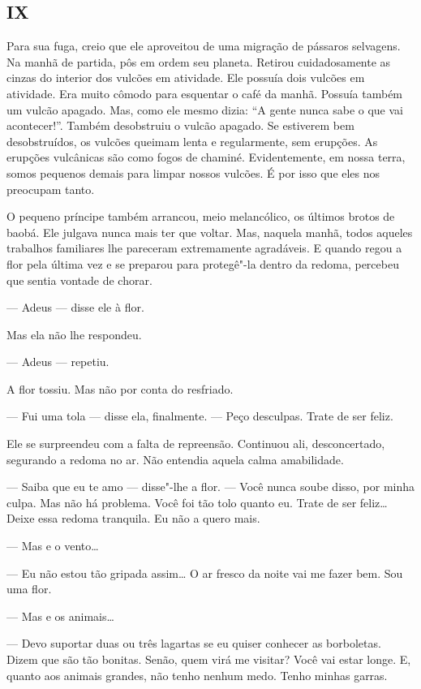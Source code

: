 \begin{Parallel}[p]{}{}
{\section{IX}

Para sua fuga, creio que ele aproveitou de uma migração de pássaros
selvagens. Na manhã de partida, pôs em ordem seu planeta. Retirou
cuidadosamente as cinzas do interior dos vulcões em atividade. Ele
possuía dois vulcões em atividade. Era muito cômodo para esquentar o
café da manhã. Possuía também um vulcão apagado. Mas, como ele mesmo
dizia: ``A gente nunca sabe o que vai acontecer!''. Também desobstruiu o
vulcão apagado. Se estiverem bem desobstruídos, os vulcões queimam lenta
e regularmente, sem erupções. As erupções vulcânicas são como fogos de
chaminé. Evidentemente, em nossa terra, somos pequenos demais para
limpar nossos vulcões. É por isso que eles nos preocupam tanto.

O pequeno príncipe também arrancou, meio melancólico, os últimos brotos
de baobá. Ele julgava nunca mais ter que voltar. Mas, naquela manhã,
todos aqueles trabalhos familiares lhe pareceram extremamente
agradáveis. E quando regou a flor pela última vez e se preparou para
protegê"-la dentro da redoma, percebeu que sentia vontade de chorar.

--- Adeus --- disse ele à flor.

Mas ela não lhe respondeu.

--- Adeus --- repetiu.

A flor tossiu. Mas não por conta do resfriado.

--- Fui uma tola --- disse ela, finalmente. --- Peço desculpas. Trate de ser
feliz.

Ele se surpreendeu com a falta de repreensão. Continuou ali,
desconcertado, segurando a redoma no ar. Não entendia aquela calma
amabilidade.

--- Saiba que eu te amo --- disse"-lhe a flor. --- Você nunca soube disso,
por minha culpa. Mas não há problema. Você foi tão tolo quanto eu. Trate
de ser feliz\ldots{} Deixe essa redoma tranquila. Eu não a quero mais.

--- Mas e o vento\ldots{}

--- Eu não estou tão gripada assim\ldots{} O ar fresco da noite vai me fazer
bem. Sou uma flor.

--- Mas e os animais\ldots{}

--- Devo suportar duas ou três lagartas se eu quiser conhecer as
borboletas. Dizem que são tão bonitas. Senão, quem virá me visitar? Você
vai estar longe. E, quanto aos animais grandes, não tenho nenhum medo.
Tenho minhas garras.

}
\end{Parallel}
